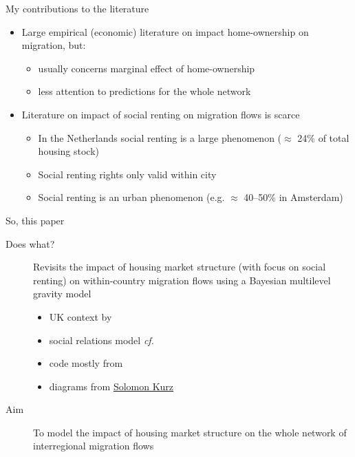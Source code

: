 \documentclass{beamer}
\begin{document}
\begin{frame}{My contributions to the literature}
  \begin{itemize}
  \item Large empirical (economic) literature on impact home-ownership on migration, but:
    \begin{itemize}
    \item usually concerns \alert{marginal} effect of home-ownership
    \item less attention to \alert{predictions} for the whole network\newline
    \end{itemize}
  \item Literature on impact of social renting on migration flows is
    scarce \footnotesize{\citep{de2009homeownership} }
	\begin{itemize}
        \item In the Netherlands social renting is a large phenomenon
          ($\approx$ 24\% of total housing stock)
        \item Social renting rights only valid \alert{within} city
        \item Social renting is an \alert{urban} phenomenon (e.g. $\approx$
          40--50\% in Amsterdam) 
        \end{itemize}
\end{itemize}
\end{frame}

\begin{frame}{So, this paper}
  \begin{description}
  \item[Does what?] \alert{Revisits} the impact of housing market
    structure (with focus on social renting) on within-country
    migration flows using a Bayesian multilevel gravity model
    \begin{footnotesize}
	\begin{itemize}
	  \item \footnotesize UK context by \citet{congdon2010random}
	  \item \footnotesize social relations model \emph{cf.}
		\citet{koster2014food}
		\item \footnotesize code mostly from \citet{mcelreath2018statistical}
		\item \footnotesize diagrams from \href{https://bookdown.org/content/4857/}{Solomon Kurz}\newline
	\end{itemize}
  \end{footnotesize}
	\item[Aim] To \alert{model} the impact of housing market structure on the whole \alert{network} of interregional migration flows
  \end{description}
\end{frame}
\end{document}

